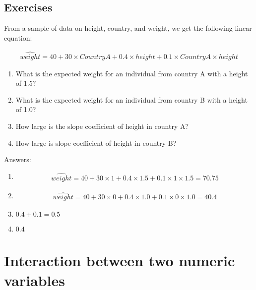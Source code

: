\subsection{Exercises}

From a sample of data on height, country, and weight, we get the following linear equation:


\begin{eqnarray}
\widehat{weight}= 40 + 30 \times CountryA + 0.4\times height + 0.1 \times CountryA\times height \nonumber
\end{eqnarray}

\begin{enumerate}
\item What is the expected weight for an individual from country A with a height of 1.5?\\
\item What is the expected weight for an individual from country B with a height of 1.0?\\
\item How large is the slope coefficient of height in country A? \\
\item How large is slope coefficient of height in country B?\\
\end{enumerate}

Answers:

\begin{enumerate}

\item 
\begin{eqnarray}
\widehat{weight}= 40 + 30 \times 1 + 0.4\times 1.5 + 0.1 \times 1\times 1.5 =70.75 \nonumber
\end{eqnarray}

\item
\begin{eqnarray}
\widehat{weight}= 40 + 30 \times 0 + 0.4\times 1.0 + 0.1 \times 0\times 1.0 =40.4\nonumber
\end{eqnarray}


\item{$0.4 + 0.1 = 0.5$}

\item{$0.4$}


\end{enumerate}


\section{Interaction between two numeric variables}

